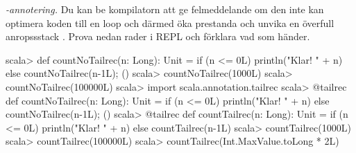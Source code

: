 \Task \emph{-annotering.} Du kan be kompilatorn att ge felmeddelande om den inte kan optimera koden till en loop och därmed öka prestanda och unvika en överfull anropssstack . Prova nedan rader i REPL och förklara vad som händer. 
\begin{REPL}
scala> def countNoTailrec(n: Long): Unit = 
         if (n <= 0L) println("Klar! " + n) else {countNoTailrec(n-1L); ()}
scala> countNoTailrec(1000L)
scala> countNoTailrec(100000L) 
scala> import scala.annotation.tailrec
scala> @tailrec def countNoTailrec(n: Long): Unit = 
         if (n <= 0L) println("Klar! " + n) else {countNoTailrec(n-1L); ()}        
scala> @tailrec def countTailrec(n: Long): Unit = 
         if (n <= 0L) println("Klar! " + n) else countTailrec(n-1L)
scala> countTailrec(1000L)
scala> countTailrec(100000L)
scala> countTailrec(Int.MaxValue.toLong * 2L)
\end{REPL}


